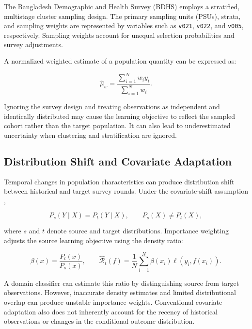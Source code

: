 \documentclass[a4paper,fleqn]{cas-sc}
\begin{document}
The Bangladesh Demographic and Health Survey (BDHS) employs a stratified, multistage cluster sampling design. The primary sampling units (PSUs), strata, and sampling weights are represented by variables such as \texttt{v021}, \texttt{v022}, and \texttt{v005}, respectively. Sampling weights account for unequal selection probabilities and survey adjustments.

A normalized weighted estimate of a population quantity can be expressed as:

\begin{equation}
\hat{\mu}_w=
\frac{\sum_{i=1}^{N}w_i y_i}
{\sum_{i=1}^{N}w_i}.
\end{equation}

Ignoring the survey design and treating observations as independent and identically distributed may cause the learning objective to reflect the sampled cohort rather than the target population. It can also lead to underestimated uncertainty when clustering and stratification are ignored.

\subsection{Distribution Shift and Covariate Adaptation}
\label{sec:conv_covariate_shift}

Temporal changes in population characteristics can produce distribution shift between historical and target survey rounds. Under the covariate-shift assumption \cite{shimodaira2000,sugiyama2012},

\begin{equation}
P_s(Y\mid X)=P_t(Y\mid X),
\qquad
P_s(X)\neq P_t(X),
\end{equation}

where $s$ and $t$ denote source and target distributions. Importance weighting adjusts the source learning objective using the density ratio:

\begin{equation}
\beta(x)=\frac{P_t(x)}{P_s(x)},
\qquad
\hat{\mathcal{R}}_t(f)=
\frac{1}{N}\sum_{i=1}^{N}
\beta(x_i)\ell(y_i,f(x_i)).
\end{equation}

A domain classifier can estimate this ratio by distinguishing source from target observations. However, inaccurate density estimates and limited distributional overlap can produce unstable importance weights. Conventional covariate adaptation also does not inherently account for the recency of historical observations or changes in the conditional outcome distribution.
\end{document}
